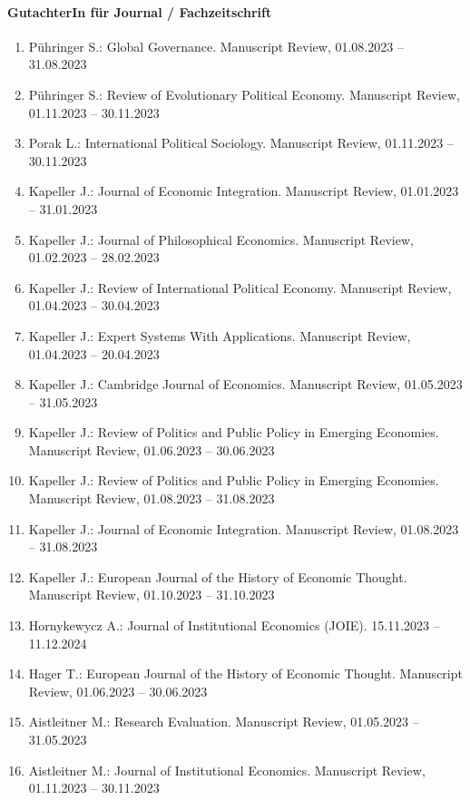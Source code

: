 \paragraph{GutachterIn für Journal / Fachzeitschrift}
\begin{enumerate}[leftmargin=*, labelsep=0.5cm]
\item Pühringer S.: Global Governance. Manuscript Review, 01.08.2023 -- 31.08.2023
\item Pühringer S.: Review of Evolutionary Political Economy. Manuscript Review, 01.11.2023 -- 30.11.2023
\item Porak L.: International Political Sociology. Manuscript Review, 01.11.2023 -- 30.11.2023
\item Kapeller J.: Journal of Economic Integration. Manuscript Review, 01.01.2023 -- 31.01.2023
\item Kapeller J.: Journal of Philosophical Economics. Manuscript Review, 01.02.2023 -- 28.02.2023
\item Kapeller J.: Review of International Political Economy. Manuscript Review, 01.04.2023 -- 30.04.2023
\item Kapeller J.: Expert Systems With Applications. Manuscript Review, 01.04.2023 -- 20.04.2023
\item Kapeller J.: Cambridge Journal of Economics. Manuscript Review, 01.05.2023 -- 31.05.2023
\item Kapeller J.: Review of Politics and Public Policy in Emerging Economies. Manuscript Review, 01.06.2023 -- 30.06.2023
\item Kapeller J.: Review of Politics and Public Policy in Emerging Economies. Manuscript Review, 01.08.2023 -- 31.08.2023
\item Kapeller J.: Journal of Economic Integration. Manuscript Review, 01.08.2023 -- 31.08.2023
\item Kapeller J.: European Journal of the History of Economic Thought. Manuscript Review, 01.10.2023 -- 31.10.2023
\item Hornykewycz A.: Journal of Institutional Economics (JOIE). 15.11.2023 -- 11.12.2024
\item Hager T.: European Journal of the History of Economic Thought. Manuscript Review, 01.06.2023 -- 30.06.2023
\item Aistleitner M.: Research Evaluation. Manuscript Review, 01.05.2023 -- 31.05.2023
\item Aistleitner M.: Journal of Institutional Economics. Manuscript Review, 01.11.2023 -- 30.11.2023
\end{enumerate}
